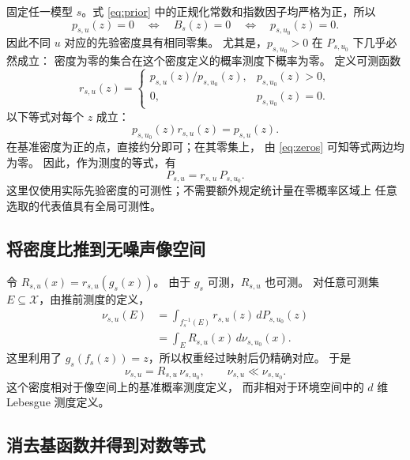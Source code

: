 \documentclass[UTF8,fontset=fandol,11pt,a4paper]{ctexart}
\theoremstyle{definition}
\newcommand{\Xset}{\mathcal X}
\begin{document}
固定任一模型 $s$。式 \eqref{eq:prior} 中的正规化常数和指数因子均严格为正，所以
\begin{equation}
 p_{s,u}(z)=0\quad\Longleftrightarrow\quad B_s(z)=0
 \quad\Longleftrightarrow\quad p_{s,u_0}(z)=0. \label{eq:zeros}
\end{equation}
因此不同 $u$ 对应的先验密度具有相同零集。
尤其是，$p_{s,u_0}>0$ 在 $P_{s,u_0}$ 下几乎必然成立：
密度为零的集合在这个密度定义的概率测度下概率为零。
定义可测函数
\begin{equation}
 r_{s,u}(z)=
 \begin{cases}
 p_{s,u}(z)/p_{s,u_0}(z),&p_{s,u_0}(z)>0,\\
 0,&p_{s,u_0}(z)=0.
 \end{cases} \label{eq:ratio}
\end{equation}
以下等式对每个 $z$ 成立：
\begin{equation}
 p_{s,u_0}(z)r_{s,u}(z)=p_{s,u}(z). \label{eq:densityproduct}
\end{equation}
在基准密度为正的点，直接约分即可；在其零集上，
由 \eqref{eq:zeros} 可知等式两边均为零。
因此，作为测度的等式，有
\begin{equation}
 P_{s,u}=r_{s,u}\,P_{s,u_0}. \label{eq:latentweight}
\end{equation}
这里仅使用实际先验密度的可测性；不需要额外规定统计量在零概率区域上
任意选取的代表值具有全局可测性。

\subsection{将密度比推到无噪声像空间}

令 $R_{s,u}(x)=r_{s,u}(g_s(x))$。
由于 $g_s$ 可测，$R_{s,u}$ 也可测。
对任意可测集 $E\subseteq\Xset$，由推前测度的定义，
\begin{align*}
 \nu_{s,u}(E)
 &=\int_{f_s^{-1}(E)}r_{s,u}(z)\,dP_{s,u_0}(z)\\
 &=\int_E R_{s,u}(x)\,d\nu_{s,u_0}(x).
\end{align*}
这里利用了 $g_s(f_s(z))=z$，所以权重经过映射后仍精确对应。
于是
\begin{equation}
 \nu_{s,u}=R_{s,u}\,\nu_{s,u_0},\qquad
 \nu_{s,u}\ll\nu_{s,u_0}. \label{eq:imageweight}
\end{equation}
这个密度相对于像空间上的基准概率测度定义，
而非相对于环境空间中的 $d$ 维 Lebesgue 测度定义。

\subsection{消去基函数并得到对数等式}
\end{document}
